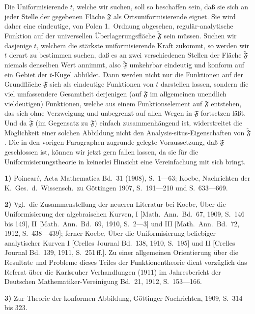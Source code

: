 \documentclass{article}
\begin{document}
Die Uniformisierende $t$, welche wir suchen, soll so beschaffen sein, daß sie sich an jeder Stelle der gegebenen Fläche $\mathfrak{F}$ als Ortsuniformisierende eignet. Sie wird daher eine eindeutige, von Polen 1.\ Ordnung abgesehen, regulär-analytische Funktion auf der universellen Überlagerungsfläche $\widetilde{\mathfrak{F}}$ sein müssen. Suchen wir dasjenige $t$, welchem die stärkste uniformisierende Kraft zukommt, so werden wir $t$ derart zu bestimmen suchen, daß es an zwei verschiedenen Stellen der Fläche $\widetilde{\mathfrak{F}}$ niemals denselben Wert annimmt, also $\widetilde{\mathfrak{F}}$ umkehrbar eindeutig und konform auf ein Gebiet der $t$-Kugel abbildet. Dann werden nicht nur die Funktionen auf der Grundfläche $\mathfrak{F}$ sich als eindeutige Funktionen von $t$ darstellen lassen, sondern die viel umfassendere Gesamtheit derjenigen (auf $\mathfrak{F}$ im allgemeinen unendlich vieldeutigen) Funktionen, welche aus einem Funktionselement auf $\mathfrak{F}$ entstehen, das sich ohne Verzweigung und unbegrenzt auf allen Wegen in $\mathfrak{F}$ fortsetzen läßt. Und da $\widetilde{\mathfrak{F}}$ (im Gegensatz zu $\mathfrak{F}$) einfach zusammenhängend ist, widerstreitet die Möglichkeit einer solchen Abbildung nicht den Analysis-situs-Eigenschaften von $\widetilde{\mathfrak{F}}$. Die in den vorigen Paragraphen zugrunde gelegte Voraussetzung, daß $\mathfrak{F}$ geschlossen ist, können wir jetzt gern fallen lassen, da sie für die Uniformisierungstheorie in keinerlei Hinsicht eine Vereinfachung mit sich bringt.

\textbf{1)} Poincaré, Acta Mathematica Bd.~31 (1908), S.~1---63; Koebe, Nachrichten der K.~Ges.\ d.~Wissensch.\ zu Göttingen 1907, S.~191---210 und S.~633---669.

\textbf{2)} Vgl.\ die Zusammenstellung der neueren Literatur bei Koebe, Über die Uniformisierung der algebraischen Kurven, I [Math.\ Ann.\ Bd.~67, 1909, S.~146 bis 149], II [Math.\ Ann.\ Bd.~69, 1910, S.~2---3] und III [Math.\ Ann.\ Bd.~72, 1912, S.~438---439]; ferner Koebe, Über die Uniformisierung beliebiger analytischer Kurven I [Crelles Journal Bd.~138, 1910, S.~195] und II [Crelles Journal Bd.~139, 1911, S.~251\,ff.]. Zu einer allgemeinen Orientierung über die Resultate und Probleme dieses Teiles der Funktionentheorie dient vorzüglich das Referat über die Karlsruher Verhandlungen (1911) im Jahresbericht der Deutschen Mathematiker-Vereinigung Bd.~21, 1912, S.~153---166.

\textbf{3)} Zur Theorie der konformen Abbildung, Göttinger Nachrichten, 1909, S.~314 bis 323.
\end{document}
